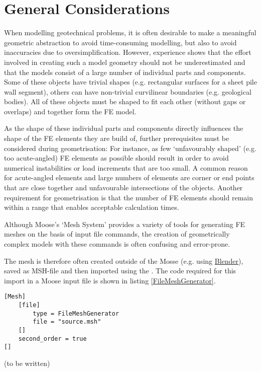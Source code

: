 \section{General Considerations}
\label{geometry-general}

When modelling geotechnical problems, it is often desirable to
make a meaningful geometric abstraction to avoid time-consuming
modelling, but also to avoid inaccuracies due to oversimplification.
However, experience shows that the effort involved in creating such
a model geometry should not be underestimated and that the models
consist of a large number of individual parts and components.
Some of these objects have trivial shapes (e.g. rectangular surfaces
for a sheet pile wall segment), others can have non-trivial curvilinear
boundaries (e.g. geological bodies).
All of these objects must be shaped to fit each other (without gaps or
overlaps) and together form the FE model.

As the shape of these individual parts and components directly influences
the shape of the FE elements they are build of, further prerequisites must
be considered during geometrisation: For instance, as few ‘unfavourably
shaped’ (e.g. too acute-angled) FE elements as possible should result in
order to avoid numerical instabilities or load increments that are too
small. A common reason for acute-angled elements and large numbers of
elements are corner or end points that are close together and unfavourable
intersections of the objects. Another requirement for geometrisation
is that the number of FE elements should remain within a range that
enables acceptable calculation times.

Although Moose's ‘Mesh System’ provides a variety of tools for generating
FE meshes on the basis of input file commands, the creation of geometrically
complex models with these commands is often confusing and error-prone.

The mesh is therefore often created outside of the Mosse (e.g. using
\href{https://blender.org}{Blender}), saved as MSH-file and then imported
using the .
The code required for this import in a Moose input file is shown in
listing \ref{FileMeshGenerator}.

\begin{lstlisting}[caption={Read mesh from a file},label={FileMeshGenerator}]
[Mesh]
    [file]
        type = FileMeshGenerator
        file = "source.msh"
    []
    second_order = true
[]
\end{lstlisting}

(to be written)
